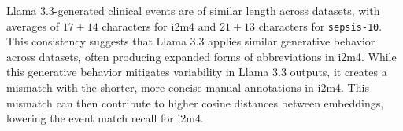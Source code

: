 


Llama 3.3-generated clinical events are of similar length across datasets, with averages of $17\pm14$ characters for i2m4 and $21\pm13$ characters for \texttt{sepsis-10}.
This consistency suggests that Llama 3.3 applies similar generative behavior across datasets, often producing expanded forms of abbreviations in i2m4.
While this generative behavior mitigates variability in Llama 3.3 outputs, it creates a mismatch with the shorter, more concise manual annotations in i2m4.
This mismatch can then contribute to higher cosine distances between embeddings, lowering the event match recall for i2m4.

